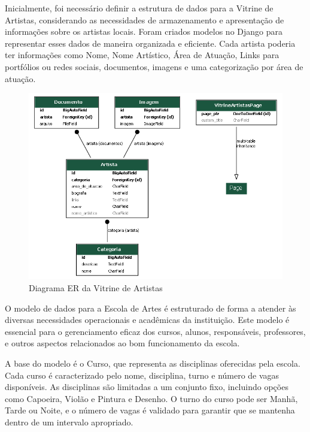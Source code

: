 
Inicialmente, foi necessário definir a estrutura de dados para a Vitrine de Artistas, considerando as necessidades de armazenamento e apresentação de informações sobre os artistas locais. Foram criados modelos no Django para representar esses dados de maneira organizada e eficiente. Cada artista poderia ter informações como Nome, Nome Artístico, Área de Atuação, Links para portfólios ou redes sociais, documentos, imagens e uma categorização por área de atuação.

\begin{figure}[htb]
	\centering
	 \begin{minipage}{0.4\textwidth}
	   \centering
	   \caption{Diagrama ER da Vitrine de Artistas} \label{er_diagram_vitrine}
	   \includegraphics[scale=0.5]{./img/er_diagram_vitrine.png}
	 \end{minipage}
\end{figure}


O modelo de dados para a Escola de Artes é estruturado de forma a atender às diversas necessidades operacionais e acadêmicas da instituição. Este modelo é essencial para o gerenciamento eficaz dos cursos, alunos, responsáveis, professores, e outros aspectos relacionados ao bom funcionamento da escola.

A base do modelo é o Curso, que representa as disciplinas oferecidas pela escola. Cada curso é caracterizado pelo nome, disciplina, turno e número de vagas disponíveis. As disciplinas são limitadas a um conjunto fixo, incluindo opções como Capoeira, Violão e Pintura e Desenho. O turno do curso pode ser Manhã, Tarde ou Noite, e o número de vagas é validado para garantir que se mantenha dentro de um intervalo apropriado.


